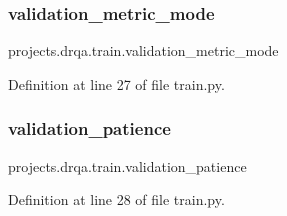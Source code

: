 \subsubsection{\texorpdfstring{validation\+\_\+metric\+\_\+mode}{validation\_metric\_mode}}
{\footnotesize\ttfamily projects.\+drqa.\+train.\+validation\+\_\+metric\+\_\+mode}



Definition at line 27 of file train.\+py.

\mbox{\label{namespaceprojects_1_1drqa_1_1train_ab59023dba084ed0b45c9289632b06e60}} 
\subsubsection{\texorpdfstring{validation\+\_\+patience}{validation\_patience}}
{\footnotesize\ttfamily projects.\+drqa.\+train.\+validation\+\_\+patience}



Definition at line 28 of file train.\+py.


